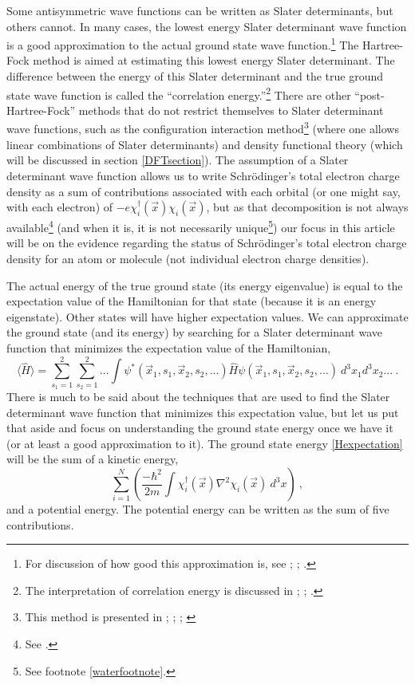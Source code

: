 \documentclass[12pt,onecolumn,secnumarabic,amsmath,amssymb,balancelastpage,nofootinbib]{article}
\begin{document}
Some antisymmetric wave functions can be written as Slater determinants, but others cannot.  In many cases, the lowest energy Slater determinant wave function is a good approximation to the actual ground state wave function.\footnote{For discussion of how good this approximation is, see \cite[ch.\ 18]{slatervol2}; \cite[pg.\ 164]{scerri1994}; \cite[sec.\ 11.1]{levineQC}.}  The Hartree-Fock method is aimed at estimating this lowest energy Slater determinant.  The difference between the energy of this Slater determinant and the true ground state wave function is called the ``correlation energy.''\footnote{The interpretation of correlation energy is discussed in \cite[sec.\ II.C]{lowdin1958}; \cite[pg.\ 436]{blinder1965}; \cite[sec.\ 9.8]{mcquarrieQC}.}  There are other ``post-Hartree-Fock'' methods that do not restrict themselves to Slater determinant wave functions, such as the configuration interaction method\footnote{This method is presented in \cite[ch.\ 4]{szaboQC}; \cite[sec.\ 9.8]{mcquarrieQC}; \cite[sec.\ 9.6]{atkins2011}; \cite[sec.\ 16.2]{levineQC}} (where one allows linear combinations of Slater determinants) and density functional theory (which will be discussed in section \ref{DFTsection}).  The assumption of a Slater determinant wave function allows us to write Schr\"{o}dinger's total electron charge density as a sum of contributions associated with each orbital (or one might say, with each electron) of $-e\chi_i^{\dagger}(\vec{x})\chi_i(\vec{x})$, but as that decomposition is not always available\footnote{See \cite{scerri2000, scerri2001, spence2001, matta2002}.} (and when it is, it is not necessarily unique\footnote{See footnote \ref{waterfootnote}.}) our focus in this article will be on the evidence regarding the status of Schr\"{o}dinger's total electron charge density for an atom or molecule (not individual electron charge densities).

The actual energy of the true ground state (its energy eigenvalue) is equal to the expectation value of the Hamiltonian for that state (because it is an energy eigenstate).  Other states will have higher expectation values.  We can approximate the ground state (and its energy) by searching for a Slater determinant wave function that minimizes the expectation value of the Hamiltonian,
\begin{equation}
\langle \widehat{H} \rangle = \sum_{s_1=1}^{2}\sum_{s_2=1}^{2}...\int{\psi^{*}(\vec{x}_1, s_1,\vec{x}_2, s_2, ...)\widehat{H}\psi(\vec{x}_1, s_1,\vec{x}_2, s_2, ...) \ d^3 x_1 d^3 x_2 ...}
\ .
\label{Hexpectation}
\end{equation}
There is much to be said about the techniques that are used to find the Slater determinant wave function that minimizes this expectation value, but let us put that aside and focus on understanding the ground state energy once we have it (or at least a good approximation to it).  The ground state energy \eqref{Hexpectation} will be the sum of a kinetic energy,
\begin{equation}
\sum_{i=1}^{N}\left(\frac{-\hbar^2}{2 m} \int{ \chi_i^{\dagger}(\vec{x})\nabla^2 \chi_i(\vec{x})\  d^3 x}\right)
\ ,
\label{electronkineticenergy}
\end{equation}
and a potential energy.  The potential energy can be written as the sum of five contributions.
\end{document}
